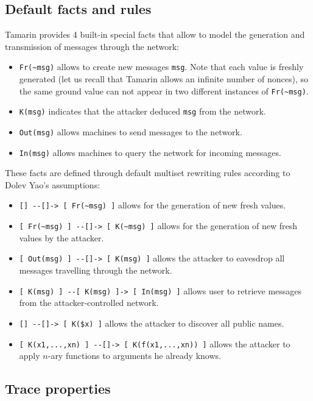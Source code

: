 \documentclass[fleqn,10pt]{SelfArx} %
\begin{document}
\subsection{Default facts and rules}\label{subsec:DefaultFacts}

Tamarin provides 4 built-in special facts that allow to model the generation and transmission of messages through the network:

\begin{itemize}
    \item \lstinline|Fr(~msg)| allows to create new messages \lstinline|msg|. Note that each value is freshly generated (let us recall that Tamarin allows an infinite number of nonces), so the same ground value can not appear in two different instances of \lstinline|Fr(~msg)|.
    \item \lstinline|K(msg)| indicates that the attacker deduced \lstinline|msg| from the network.
    \item \lstinline|Out(msg)| allows machines to send messages to the network.
    \item \lstinline|In(msg)| allows machines to query the network for incoming messages.
\end{itemize}

These facts are defined through default multiset rewriting rules according to Dolev Yao's assumptions:

\begin{itemize}
    \item \lstinline|[] --[]-> [ Fr(~msg) ]| allows for the generation of new fresh values.
    \item \lstinline|[ Fr(~msg) ] --[]-> [ K(~msg) ]| allows for the generation of new fresh values by the attacker.
    \item \lstinline|[ Out(msg) ] --[]-> [ K(msg) ]| allows the attacker to eavesdrop all messages travelling through the network. 
    \item \lstinline|[ K(msg) ] --[ K(msg) ]-> [ In(msg) ]| allows user to retrieve messages from the attacker-controlled network.
    \item \lstinline|[] --[]-> [ K($x) ]| allows the attacker to discover all public names.
    \item \lstinline|[ K(x1,...,xn) ] --[]-> [ K(f(x1,...,xn)) ]| allows the attacker to apply $n$-ary functions to arguments he already knows.
\end{itemize}

\subsection{Trace properties}\label{subsec:TraceProperties}
\end{document}
